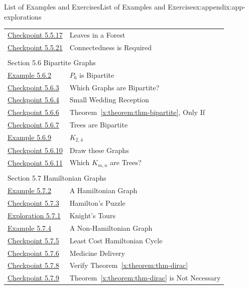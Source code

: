 \documentclass[oneside,10pt,]{book}
\newcommand{\xreffont}{\relax}
\numberwithin{equation}{section}
\begin{document}
\begin{appendixptx}{List of Examples and Exercises}{}{List of Examples and Exercises}{}{}{x:appendix:app-explorations}
\begin{longtable}[l]{ll}
\hyperref[x:exercise:ex-min-max-leaves-forest]{Checkpoint 5.5.17}& Leaves in a Forest\\
\hyperref[x:exercise:ex-not-a-tree]{Checkpoint 5.5.21}& Connectedness is Required\\
\multicolumn{2}{l}{\null}\\[1.5ex] \multicolumn{2}{l}{\large Section 5.6 Bipartite Graphs}\\[0.5ex]
\hyperref[x:example:eg-bipartite]{Example 5.6.2}& \(P_6\) is Bipartite\\
\hyperref[x:exercise:ex-which-bipartite]{Checkpoint 5.6.3}& Which Graphs are Bipartite?\\
\hyperref[x:exercise:ex-explain-g8-bipartite]{Checkpoint 5.6.4}& Small Wedding Reception\\
\hyperref[x:exercise:ex-bipartite-only-if]{Checkpoint 5.6.6}& Theorem~{\xreffont\ref*{x:theorem:thm-bipartite}}, Only If\\
\hyperref[x:exercise:ex-tree-bipartite]{Checkpoint 5.6.7}& Trees are Bipartite\\
\hyperref[x:example:eg-complete-bipartite]{Example 5.6.9}& \(K_{2,4}\)\\
\hyperref[x:exercise:ex-draw-complete-bipartite]{Checkpoint 5.6.10}& Draw these Graphs\\
\hyperref[x:exercise:ex-which-Kmn-are-trees]{Checkpoint 5.6.11}& Which \(K_{m,n}\) are Trees?\\
\multicolumn{2}{l}{\null}\\[1.5ex] \multicolumn{2}{l}{\large Section 5.7 Hamiltonian Graphs}\\[0.5ex]
\hyperref[x:example:eg-hamiltonian]{Example 5.7.2}& A Hamiltonian Graph\\
\hyperref[x:exercise:ex-find-hamiltonian]{Checkpoint 5.7.3}& Hamilton's Puzzle\\
\hyperref[x:exploration:expl-knights-tour]{Exploration 5.7.1}& Knight's Tours\\
\hyperref[x:example:eg-not-hamiltonian]{Example 5.7.4}& A Non-Hamiltonian Graph\\
\hyperref[x:exercise:ex-find-least-cost-hamiltonian]{Checkpoint 5.7.5}& Least Cost Hamiltonian Cycle\\
\hyperref[x:exercise:ex-hamiltonian-]{Checkpoint 5.7.6}& Medicine Delivery\\
\hyperref[x:exercise:ex-verify-dirac]{Checkpoint 5.7.8}& Verify Theorem~{\xreffont\ref*{x:theorem:thm-dirac}}\\
\hyperref[x:exercise:ex-hamiltonian-necessary]{Checkpoint 5.7.9}& Theorem~{\xreffont\ref*{x:theorem:thm-dirac}} is Not Necessary\\

\end{longtable}
\end{appendixptx}
\end{document}

